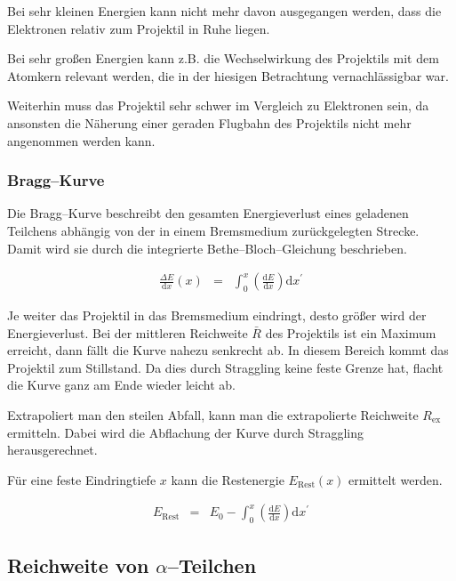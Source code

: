 \documentclass[12pt,a4paper]{scrartcl}
\numberwithin{equation}{section} %
\begin{document}
Bei sehr kleinen Energien kann nicht mehr davon ausgegangen werden, dass die Elektronen relativ zum Projektil in Ruhe liegen.

Bei sehr großen Energien kann z.B. die Wechselwirkung des Projektils mit dem Atomkern relevant werden, die in der hiesigen Betrachtung vernachlässigbar war.

Weiterhin muss das Projektil sehr schwer im Vergleich zu Elektronen sein, da ansonsten die Näherung einer geraden Flugbahn des Projektils nicht mehr angenommen werden kann.

\hypertarget{bragg-kurve}{%
\subsubsection{Bragg--Kurve}\label{bragg-kurve}}

Die Bragg--Kurve beschreibt den gesamten Energieverlust eines geladenen Teilchens abhängig von der in einem Bremsmedium zurückgelegten Strecke. Damit wird sie durch die integrierte Bethe--Bloch--Gleichung beschrieben.

\begin{eqnarray}
    \frac{\Delta E}{\mathrm dx}(x) &=&
        \int_0^x \left(\frac{\mathrm dE}{\mathrm dx}\right) \mathrm dx^\prime
\end{eqnarray}

\noindent
Je weiter das Projektil in das Bremsmedium eindringt, desto größer wird der Energieverlust. Bei der mittleren Reichweite $\bar R$ des Projektils ist ein Maximum erreicht, dann fällt die Kurve nahezu senkrecht ab. In diesem Bereich kommt das Projektil zum Stillstand. Da dies durch Straggling keine feste Grenze hat, flacht die Kurve ganz am Ende wieder leicht ab.

Extrapoliert man den steilen Abfall, kann man die extrapolierte Reichweite $R_\mathrm{ex}$ ermitteln. Dabei wird die Abflachung der Kurve durch Straggling herausgerechnet.

Für eine feste Eindringtiefe $x$ kann die Restenergie $E_\mathrm{Rest}(x)$ ermittelt werden.

\begin{eqnarray}
    E_\mathrm{Rest}
        &=& E_0
        - \int_0^x \left(\frac{\mathrm dE}{\mathrm dx}\right) \mathrm dx^\prime
        \label{Restenergie}
\end{eqnarray}

\hypertarget{reichweite-von-alpha-teilchen}{%
\subsection{Reichweite von $\alpha$--Teilchen}\label{reichweite-von-alpha-teilchen}}
\end{document}
